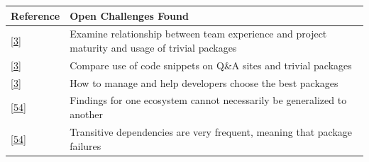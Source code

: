 \documentclass[]{book}
\begin{document}
\begin{longtable}[]{@{}ll@{}}
\toprule
\begin{minipage}[b]{0.13\columnwidth}\raggedright\strut
Reference\strut
\end{minipage} & \begin{minipage}[b]{0.29\columnwidth}\raggedright\strut
Open Challenges Found\strut
\end{minipage}\tabularnewline
\midrule
\endhead
\begin{minipage}[t]{0.13\columnwidth}\raggedright\strut
{[}\protect\hyperlink{ref-Abdalkareem2017}{3}{]}\strut
\end{minipage} & \begin{minipage}[t]{0.29\columnwidth}\raggedright\strut
Examine relationship between team experience and project maturity and
usage of trivial packages\strut
\end{minipage}\tabularnewline
\begin{minipage}[t]{0.13\columnwidth}\raggedright\strut
{[}\protect\hyperlink{ref-Abdalkareem2017}{3}{]}\strut
\end{minipage} & \begin{minipage}[t]{0.29\columnwidth}\raggedright\strut
Compare use of code snippets on Q\&A sites and trivial packages\strut
\end{minipage}\tabularnewline
\begin{minipage}[t]{0.13\columnwidth}\raggedright\strut
{[}\protect\hyperlink{ref-Abdalkareem2017}{3}{]}\strut
\end{minipage} & \begin{minipage}[t]{0.29\columnwidth}\raggedright\strut
How to manage and help developers choose the best packages\strut
\end{minipage}\tabularnewline
\begin{minipage}[t]{0.13\columnwidth}\raggedright\strut
{[}\protect\hyperlink{ref-Decan2018}{54}{]}\strut
\end{minipage} & \begin{minipage}[t]{0.29\columnwidth}\raggedright\strut
Findings for one ecosystem cannot necessarily be generalized to
another\strut
\end{minipage}\tabularnewline
\begin{minipage}[t]{0.13\columnwidth}\raggedright\strut
{[}\protect\hyperlink{ref-Decan2018}{54}{]}\strut
\end{minipage} & \begin{minipage}[t]{0.29\columnwidth}\raggedright\strut
Transitive dependencies are very frequent, meaning that package failures

\end{minipage}
\end{longtable}
\end{document}
